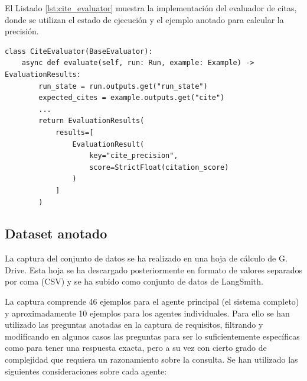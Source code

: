 El Listado \ref{lst:cite_evaluator} muestra la implementación del evaluador de citas, donde se utilizan el estado de ejecución y el ejemplo anotado para calcular la precisión.

\begin{lstlisting}[caption={Evaluador de citas},label={lst:cite_evaluator}]
class CiteEvaluator(BaseEvaluator):
    async def evaluate(self, run: Run, example: Example) -> EvaluationResults:
        run_state = run.outputs.get("run_state")
        expected_cites = example.outputs.get("cite")
        ...
        return EvaluationResults(
            results=[
                EvaluationResult(
                    key="cite_precision",
                    score=StrictFloat(citation_score)
                )
            ]
        )
\end{lstlisting}


\subsection{Dataset anotado}
\label{sec:dataset}
La captura del conjunto de datos se ha realizado en una hoja de cálculo de G. Drive. Esta hoja se ha descargado posteriormente en formato de valores separados por coma (CSV) y se ha subido como conjunto de datos de LangSmith.

La captura comprende 46 ejemplos para el agente principal (el sistema completo) y aproximadamente 10 ejemplos para los agentes individuales. Para ello se han utilizado las preguntas anotadas en la captura de requisitos, filtrando y modificando en algunos casos las preguntas para ser lo suficientemente específicas como para tener una respuesta exacta, pero a su vez con cierto grado de complejidad que requiera un razonamiento sobre la consulta. Se han utilizado las siguientes consideraciones sobre cada agente:

